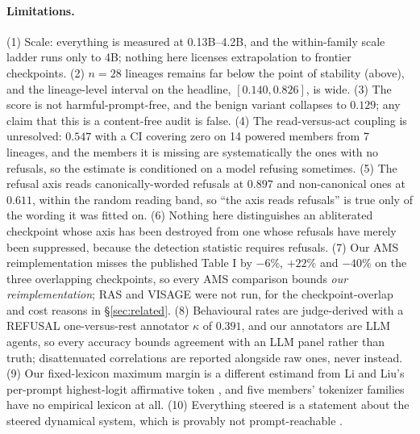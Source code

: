 \documentclass[11pt,letterpaper]{article}
\begin{document}
\paragraph{Limitations.} (1) Scale: everything is measured at 0.13B--4.2B, and the within-family scale ladder runs only to 4B; nothing here licenses extrapolation to frontier checkpoints. (2) $n = 28$ lineages remains far below the point of stability (above), and the lineage-level interval on the headline, $[0.140, 0.826]$, is wide. (3) The score is not harmful-prompt-free, and the benign variant collapses to $0.129$; any claim that this is a content-free audit is false. (4) The read-versus-act coupling is unresolved: $0.547$ with a CI covering zero on 14 powered members from 7 lineages, and the members it is missing are systematically the ones with no refusals, so the estimate is conditioned on a model refusing sometimes. (5) The refusal axis reads canonically-worded refusals at $0.897$ and non-canonical ones at $0.611$, within the random reading band, so ``the axis reads refusals'' is true only of the wording it was fitted on. (6) Nothing here distinguishes an abliterated checkpoint whose axis has been destroyed from one whose refusals have merely been suppressed, because the detection statistic requires refusals. (7) Our AMS reimplementation misses the published Table I by $-6\%$, $+22\%$ and $-40\%$ on the three overlapping checkpoints, so every AMS comparison bounds \emph{our reimplementation}; RAS and VISAGE were not run, for the checkpoint-overlap and cost reasons in \S\ref{sec:related}. (8) Behavioural rates are judge-derived with a REFUSAL one-versus-rest annotator $\kappa$ of $0.391$, and our annotators are LLM agents, so every accuracy bounds agreement with an LLM panel rather than truth; disattenuated correlations are reported alongside raw ones, never instead. (9) Our fixed-lexicon maximum margin is a different estimand from Li and Liu's per-prompt highest-logit affirmative token \citep{LiLiu2025}, and five members' tokenizer families have no empirical lexicon at all. (10) Everything steered is a statement about the steered dynamical system, which is provably not prompt-reachable \citep{Mishra2026}.
\end{document}
